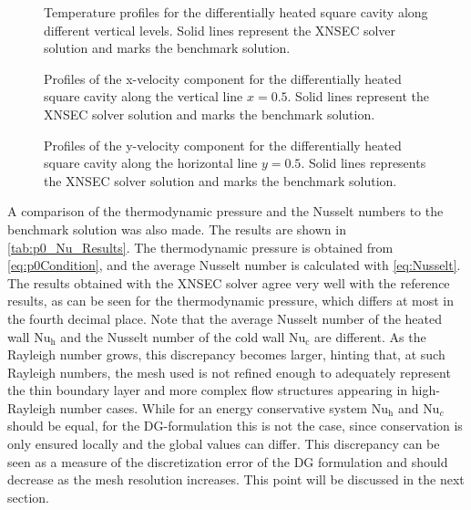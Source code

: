 \begin{figure}[h]
	\centering
	\pgfplotsset{width=0.22\textwidth, compat=1.3} 
	\caption[Temperature profiles for the differentially heated square cavity along different vertical levels.]{Temperature profiles for the differentially heated square cavity along different vertical levels. Solid lines represent the XNSEC solver solution and marks the benchmark solution.}
	\label{fig:TempProfile}
\end{figure}
%
\begin{figure}[h]
	\centering
	\pgfplotsset{width=0.22\textwidth, compat=1.3}
	\caption[Profiles of the x-velocity component for the differentially heated square cavity along the vertical line $x=0.5$.]{Profiles of the x-velocity component for the differentially heated square cavity along the vertical line $x=0.5$. Solid lines represent the XNSEC solver solution and marks the benchmark solution.}
	\label{fig:VelocityXProfile}
\end{figure}
%
\begin{figure}[h]
	\centering
	\pgfplotsset{width=0.22\textwidth, compat=1.3}
	\caption[Profiles of the y-velocity component for the differentially heated square cavity along the horizontal line $y=0.5$.]{Profiles of the y-velocity component for the differentially heated square cavity along the horizontal line $y=0.5$. Solid lines represents the XNSEC solver solution and marks the benchmark solution.}
	\label{fig:VelocityYProfile}
\end{figure}
\FloatBarrier
A comparison of the thermodynamic pressure and the Nusselt numbers to the benchmark solution was also made. The results are shown in \cref{tab:p0_Nu_Results}.  The thermodynamic pressure is obtained from \cref{eq:p0Condition}, and the average Nusselt number is calculated with \cref{eq:Nusselt}. The results obtained with the XNSEC solver agree very well with the reference results, as can be seen for the thermodynamic pressure, which differs at most in the fourth decimal place. Note that the average Nusselt number of the heated wall $\text{Nu}_\text{h}$ and the Nusselt number of the cold wall $\text{Nu}_\text{c}$ are different. As the Rayleigh number grows, this discrepancy becomes larger, hinting that, at such Rayleigh numbers, the mesh used is not refined enough to adequately represent the thin boundary layer and more complex flow structures appearing in high-Rayleigh number cases. While for an energy conservative system $\text{Nu}_\text{h}$ and $\text{Nu}_c$ should be equal, for the DG-formulation this is not the case, since conservation is only ensured locally and the global values can differ. This discrepancy can be seen as a measure of the discretization error of the DG formulation and should decrease as the mesh resolution increases. This point will be discussed in the next section.
